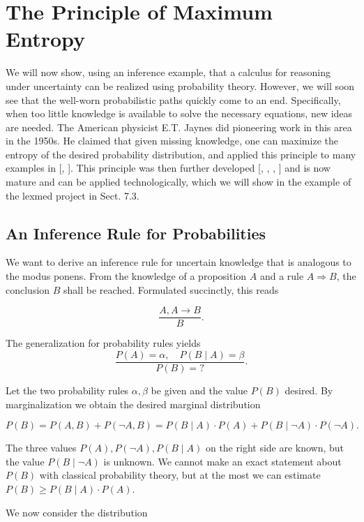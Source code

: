 \documentclass[10pt]{book}
\begin{document}
\section{The Principle of Maximum Entropy}
We will now show, using an inference example, that a calculus for reasoning under uncertainty can be realized using probability theory. However, we will soon see that the well-worn probabilistic paths quickly come to an end. Specifically, when too little knowledge is available to solve the necessary equations, new ideas are needed. The American physicist E.T. Jaynes did pioneering work in this area in the 1950s. He claimed that given missing knowledge, one can maximize the entropy of the desired probability distribution, and applied this principle to many examples in [\cite{jaynes1957itsm}, \cite{jaynes2003probability}]. This principle was then further developed [\cite{cheeseman1983generalised}, \cite{nilsson1986probabilistic}, \cite{kane1989maxent}, \cite{kapur1992entropy}] and is now mature and can be applied technologically, which we will show in the example of the lexmed project in Sect. 7.3.

\subsection{An Inference Rule for Probabilities}
We want to derive an inference rule for uncertain knowledge that is analogous to the modus ponens. From the knowledge of a proposition $A$ and a rule $A \Rightarrow B$, the conclusion $B$ shall be reached. Formulated succinctly, this reads

$$
\frac{A, A \rightarrow B}{B} .
$$

The generalization for probability rules yields
$$
\frac{P(A)=\alpha, \quad P(B \mid A)=\beta}{P(B)=?} .
$$

Let the two probability rules $\alpha, \beta$ be given and the value $P(B)$ desired. By marginalization we obtain the desired marginal distribution

$$
P(B)=P(A, B)+P(\neg A, B)=P(B \mid A) \cdot P(A)+P(B \mid \neg A) \cdot P(\neg A) .
$$

The three values $P(A), P(\neg A), P(B \mid A)$ on the right side are known, but the value $P(B \mid \neg A)$ is unknown. We cannot make an exact statement about $P(B)$ with classical probability theory, but at the most we can estimate $P(B) \geq P(B \mid A) \cdot P(A)$.

We now consider the distribution
\end{document}
